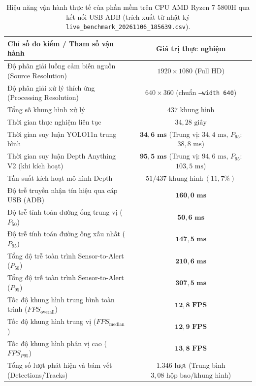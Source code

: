 \begin{table}[htbp]
\centering
\caption{Hiệu năng vận hành thực tế của phần mềm trên CPU AMD Ryzen 7 5800H qua kết nối USB ADB (trích xuất từ nhật ký \texttt{live\_benchmark\_20261106\_185639.csv}).}
\label{tab:software_runtime_benchmark}
\begin{tabular}{|l|c|}
\hline
\textbf{Chỉ số đo kiểm / Tham số vận hành} & \textbf{Giá trị thực nghiệm} \\ \hline
Độ phân giải luồng cảm biến nguồn (Source Resolution) & $1920 \times 1080$ (Full HD) \\ \hline
Độ phân giải xử lý thích ứng (Processing Resolution) & $640 \times 360$ (chuẩn \texttt{--width 640}) \\ \hline
Tổng số khung hình xử lý & $437\text{ khung hình}$ \\ \hline
Thời gian thực nghiệm liên tục & $34,28\text{ giây}$ \\ \hline
Thời gian suy luận YOLO11n trung bình & $\mathbf{34,6\text{ ms}}$ (Trung vị: $34,4\text{ ms}$, $P_{95}$: $38,8\text{ ms}$) \\ \hline
Thời gian suy luận Depth Anything V2 (khi kích hoạt) & $\mathbf{95,5\text{ ms}}$ (Trung vị: $94,6\text{ ms}$, $P_{95}$: $103,5\text{ ms}$) \\ \hline
Tần suất kích hoạt mô hình Depth & $51 / 437\text{ khung hình}\ (11,7\%)$ \\ \hline
Độ trễ truyền nhận tín hiệu qua cáp USB (ADB) & $\mathbf{160,0\text{ ms}}$ \\ \hline
Độ trễ tính toán đường ống trung vị ($P_{50}$) & $\mathbf{50,6\text{ ms}}$ \\ \hline
Độ trễ tính toán đường ống xấu nhất ($P_{95}$) & $\mathbf{147,5\text{ ms}}$ \\ \hline
Tổng độ trễ toàn trình Sensor-to-Alert ($P_{50}$) & $\mathbf{210,6\text{ ms}}$ \\ \hline
Tổng độ trễ toàn trình Sensor-to-Alert ($P_{95}$) & $\mathbf{307,5\text{ ms}}$ \\ \hline
Tốc độ khung hình trung bình toàn trình ($FPS_{\text{overall}}$) & $\mathbf{12,8\text{ FPS}}$ \\ \hline
Tốc độ khung hình trung vị ($FPS_{\text{median}}$) & $\mathbf{12,9\text{ FPS}}$ \\ \hline
Tốc độ khung hình phân vị cao ($FPS_{P95}$) & $\mathbf{13,8\text{ FPS}}$ \\ \hline
Tổng số lượt phát hiện và bám vết (Detections/Tracks) & $1.346\text{ lượt}$ (Trung bình $3,08\text{ hộp bao/khung hình}$) \\ \hline

\end{tabular}
\end{table}
